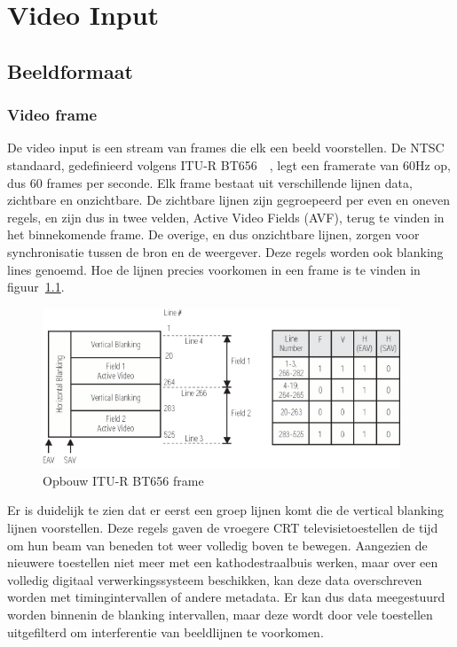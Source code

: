 \chapter{Video Input}

\section{Beeldformaat}
	\subsection{Video frame}
		\par De video input is een stream van frames die elk een beeld voorstellen. De NTSC standaard, gedefinieerd volgens ITU-R BT656~\cite{bib_3}~\cite{bib_4}, legt een framerate van 60Hz op, dus 60 frames per seconde. Elk frame bestaat uit verschillende lijnen data, zichtbare en onzichtbare. De zichtbare lijnen zijn gegroepeerd per even en oneven regels, en zijn dus in twee velden, Active Video Fields (AVF), terug te vinden in het binnekomende frame. De overige, en dus onzichtbare lijnen, zorgen voor synchronisatie tussen de bron en de weergever. Deze regels worden ook blanking lines genoemd. Hoe de lijnen precies voorkomen in een frame is te vinden in figuur~\ref{fig:OpbouwFrameImage}.
		
		\begin{figure}[H]
			\centering
			\includegraphics[width=0.95\textwidth]{Chapters/Chapter1/Images/Frame.png}
			\caption{Opbouw ITU-R BT656 frame~\cite{bib_15}}
			\label{fig:OpbouwFrameImage}
		\end{figure}

		\par Er is duidelijk te zien dat er eerst een groep lijnen komt die de vertical blanking lijnen voorstellen. Deze regels gaven de vroegere CRT televisietoestellen de tijd om hun beam van beneden tot weer volledig boven te bewegen. Aangezien de nieuwere toestellen niet meer met een kathodestraalbuis werken, maar over een volledig digitaal verwerkingssysteem beschikken, kan deze data overschreven worden met timingintervallen of andere metadata. Er kan dus data meegestuurd worden binnenin de blanking intervallen, maar deze wordt door vele toestellen uitgefilterd om interferentie van beeldlijnen te voorkomen.

